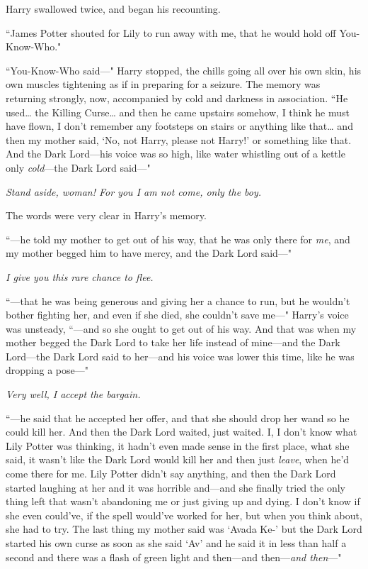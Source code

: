 Harry swallowed twice, and began his recounting.

``James Potter shouted for Lily to run away with me, that he would hold off You-Know-Who."

``You-Know-Who said—" Harry stopped, the chills going all over his own skin, his own muscles tightening as if in preparing for a seizure. The memory was returning strongly, now, accompanied by cold and darkness in association. ``He used{\ldots} the Killing Curse{\ldots} and then he came upstairs somehow, I think he must have flown, I don't remember any footsteps on stairs or anything like that{\ldots} and then my mother said, `No, not Harry, please not Harry!' or something like that. And the Dark Lord—his voice was so high, like water whistling out of a kettle only \emph{cold}—the Dark Lord said—"

\emph{Stand aside, woman! For you I am not come, only the boy.}

The words were very clear in Harry's memory.

``—he told my mother to get out of his way, that he was only there for \emph{me}, and my mother begged him to have mercy, and the Dark Lord said—"

\emph{I give you this rare chance to flee.}

``—that he was being generous and giving her a chance to run, but he wouldn't bother fighting her, and even if she died, she couldn't save me—" Harry's voice was unsteady, ``—and so she ought to get out of his way. And that was when my mother begged the Dark Lord to take her life instead of mine—and the Dark Lord—the Dark Lord said to her—and his voice was lower this time, like he was dropping a pose—"

\emph{Very well, I accept the bargain.}

``—he said that he accepted her offer, and that she should drop her wand so he could kill her. And then the Dark Lord waited, just waited. I, I don't know what Lily Potter was thinking, it hadn't even made sense in the first place, what she said, it wasn't like the Dark Lord would kill her and then just \emph{leave}, when he'd come there for me. Lily Potter didn't say anything, and then the Dark Lord started laughing at her and it was horrible and—and she finally tried the only thing left that wasn't abandoning me or just giving up and dying. I don't know if she even could've, if the spell would've worked for her, but when you think about, she had to try. The last thing my mother said was `Avada Ke-' but the Dark Lord started his own curse as soon as she said `Av' and he said it in less than half a second and there was a flash of green light and then—and then—\emph{and then}—"

